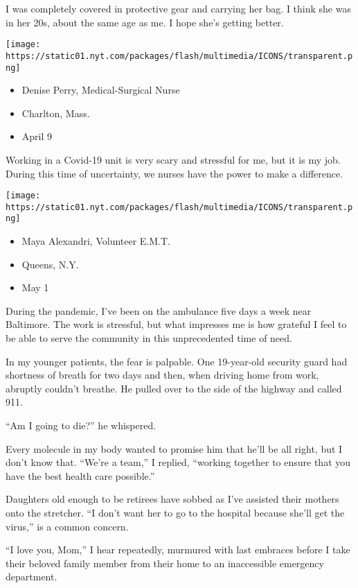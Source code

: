 I was completely covered in protective gear and carrying her bag. I
think she was in her 20s, about the same age as me. I hope she's getting
better.

\texttt{[image: https://static01.nyt.com/packages/flash/multimedia/ICONS/transparent.png]}

\begin{itemize}
\tightlist
\item
  Denise Perry, Medical-Surgical Nurse
\item
  Charlton, Mass.
\item
  April 9
\end{itemize}

Working in a Covid-19 unit is very scary and stressful for me, but it is
my job. During this time of uncertainty, we nurses have the power to
make a difference.

\texttt{[image: https://static01.nyt.com/packages/flash/multimedia/ICONS/transparent.png]}

\begin{itemize}
\tightlist
\item
  Maya Alexandri, Volunteer E.M.T.
\item
  Queens, N.Y.
\item
  May 1
\end{itemize}

During the pandemic, I've been on the ambulance five days a week near
Baltimore. The work is stressful, but what impresses me is how grateful
I feel to be able to serve the community in this unprecedented time of
need.

In my younger patients, the fear is palpable. One 19-year-old security
guard had shortness of breath for two days and then, when driving home
from work, abruptly couldn't breathe. He pulled over to the side of the
highway and called 911.

``Am I going to die?'' he whispered.

Every molecule in my body wanted to promise him that he'll be all right,
but I don't know that. ``We're a team,'' I replied, ``working together
to ensure that you have the best health care possible.''

Daughters old enough to be retirees have sobbed as I've assisted their
mothers onto the stretcher. ``I don't want her to go to the hospital
because she'll get the virus,'' is a common concern.

``I love you, Mom,'' I hear repeatedly, murmured with last embraces
before I take their beloved family member from their home to an
inaccessible emergency department.

